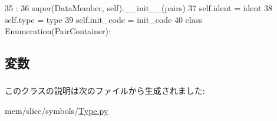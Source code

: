 \begin{DoxyCode}
35                                                      :
36         super(DataMember, self).__init__(pairs)
37         self.ident = ident
38         self.type = type
39         self.init_code = init_code
40 
class Enumeration(PairContainer):
\end{DoxyCode}


\subsection{変数}
\hypertarget{classslicc_1_1symbols_1_1Type_1_1DataMember_a2fe57e2d3d2cba9a3aeba2f629eaa78b}{
\subsubsection[{ident}]{}}
\label{classslicc_1_1symbols_1_1Type_1_1DataMember_a2fe57e2d3d2cba9a3aeba2f629eaa78b}
\hypertarget{classslicc_1_1symbols_1_1Type_1_1DataMember_ad273ab1031f90e75747a4fbdeca02eed}{
\subsubsection[{init\_\-code}]{}}
\label{classslicc_1_1symbols_1_1Type_1_1DataMember_ad273ab1031f90e75747a4fbdeca02eed}
\hypertarget{classslicc_1_1symbols_1_1Type_1_1DataMember_a7aead736a07eaf25623ad7bfa1f0ee2d}{
\subsubsection[{type}]{}}
\label{classslicc_1_1symbols_1_1Type_1_1DataMember_a7aead736a07eaf25623ad7bfa1f0ee2d}


このクラスの説明は次のファイルから生成されました:\begin{DoxyCompactItemize}
\item 
mem/slicc/symbols/\hyperlink{Type_8py}{Type.py}\end{DoxyCompactItemize}
